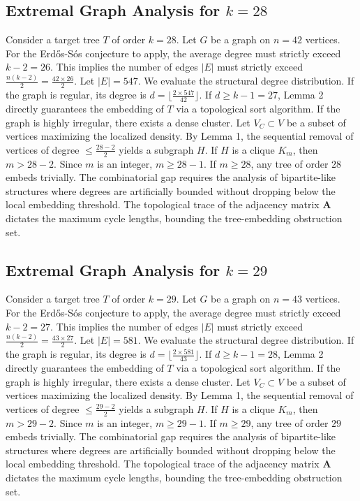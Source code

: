 \documentclass[11pt,a4paper]{article}
\begin{document}
\subsection{Extremal Graph Analysis for $k=28$}
Consider a target tree $T$ of order $k=28$.
Let $G$ be a graph on $n=42$ vertices.
For the Erd\H{o}s-S\'os conjecture to apply, the average degree must strictly exceed $k-2 = 26$.
This implies the number of edges $|E|$ must strictly exceed $\frac{n(k-2)}{2} = \frac{42 \times 26}{2}$.
Let $|E| = 547$.
We evaluate the structural degree distribution. If the graph is regular, its degree is $d = \lfloor \frac{2 \times 547}{42} \rfloor$.
If $d \geq k-1 = 27$, Lemma 2 directly guarantees the embedding of $T$ via a topological sort algorithm.
If the graph is highly irregular, there exists a dense cluster. Let $V_C \subset V$ be a subset of vertices maximizing the localized density.
By Lemma 1, the sequential removal of vertices of degree $\leq \frac{28-2}{2}$ yields a subgraph $H$.
If $H$ is a clique $K_{m}$, then $m > 28-2$. Since $m$ is an integer, $m \geq 28-1$. If $m \geq 28$, any tree of order $28$ embeds trivially.
The combinatorial gap requires the analysis of bipartite-like structures where degrees are artificially bounded without dropping below the local embedding threshold. The topological trace of the adjacency matrix $\mathbf{A}$ dictates the maximum cycle lengths, bounding the tree-embedding obstruction set.


\subsection{Extremal Graph Analysis for $k=29$}
Consider a target tree $T$ of order $k=29$.
Let $G$ be a graph on $n=43$ vertices.
For the Erd\H{o}s-S\'os conjecture to apply, the average degree must strictly exceed $k-2 = 27$.
This implies the number of edges $|E|$ must strictly exceed $\frac{n(k-2)}{2} = \frac{43 \times 27}{2}$.
Let $|E| = 581$.
We evaluate the structural degree distribution. If the graph is regular, its degree is $d = \lfloor \frac{2 \times 581}{43} \rfloor$.
If $d \geq k-1 = 28$, Lemma 2 directly guarantees the embedding of $T$ via a topological sort algorithm.
If the graph is highly irregular, there exists a dense cluster. Let $V_C \subset V$ be a subset of vertices maximizing the localized density.
By Lemma 1, the sequential removal of vertices of degree $\leq \frac{29-2}{2}$ yields a subgraph $H$.
If $H$ is a clique $K_{m}$, then $m > 29-2$. Since $m$ is an integer, $m \geq 29-1$. If $m \geq 29$, any tree of order $29$ embeds trivially.
The combinatorial gap requires the analysis of bipartite-like structures where degrees are artificially bounded without dropping below the local embedding threshold. The topological trace of the adjacency matrix $\mathbf{A}$ dictates the maximum cycle lengths, bounding the tree-embedding obstruction set.
\end{document}
